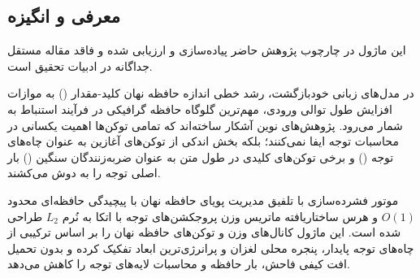 \subsection{معرفی و انگیزه}
این ماژول در چارچوب پژوهش حاضر پیاده‌سازی و ارزیابی شده و فاقد مقاله مستقل جداگانه در ادبیات تحقیق است.

در مدل‌های زبانی خودبازگشت، رشد خطی اندازه حافظه نهان کلید-مقدار () به موازات افزایش طول توالی ورودی، مهم‌ترین گلوگاه حافظه گرافیکی در فرآیند استنباط به شمار می‌رود. پژوهش‌های نوین آشکار ساخته‌اند که تمامی توکن‌ها اهمیت یکسانی در محاسبات توجه ایفا نمی‌کنند؛ بلکه بخش اندکی از توکن‌های آغازین به عنوان چاه‌های توجه () و برخی توکن‌های کلیدی در طول متن به عنوان ضربه‌زنندگان سنگین () بار اصلی توجه را به دوش می‌کشند.

موتور فشرده‌سازی  با تلفیق مدیریت پویای حافظه نهان با پیچیدگی حافظه‌ای محدود $O(1)$ و هرس ساختاریافته ماتریس وزن پروجکشن‌های توجه با اتکا به نُرم $L_2$ طراحی شده است. این ماژول کانال‌های وزن و توکن‌های حافظه نهان را بر اساس ترکیبی از چاه‌های توجه پایدار، پنجره محلی لغزان و پرانرژی‌ترین ابعاد تفکیک کرده و بدون تحمیل افت کیفی فاحش، بار حافظه و محاسبات لایه‌های توجه را کاهش می‌دهد.
